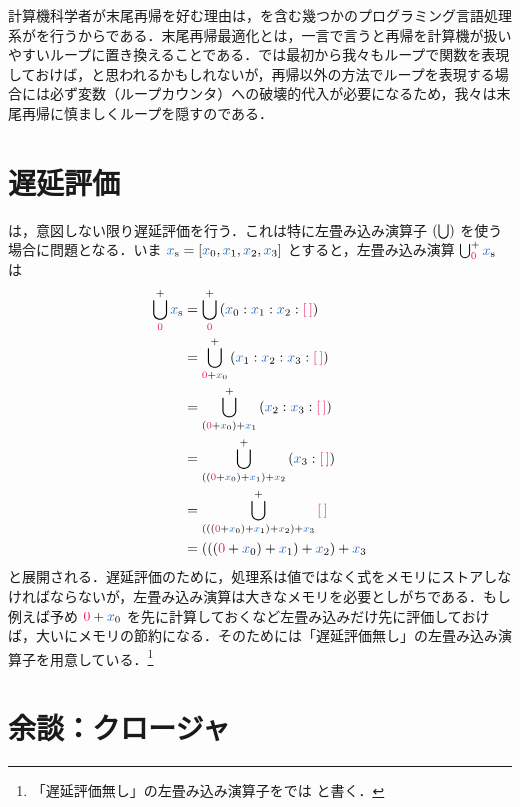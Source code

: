\documentclass[a5paper,twoside,fleqn,draft]{jsbook}
\begin{document}
計算機科学者が末尾再帰を好む理由は，\haskell を含む幾つかのプログラミング言語処理系がを行うからである．末尾再帰最適化とは，一言で言うと再帰を計算機が扱いやすいループに置き換えることである．では最初から我々もループで関数を表現しておけば，と思われるかもしれないが，再帰以外の方法でループを表現する場合には必ず変数（ループカウンタ）への破壊的代入が必要になるため，我々は末尾再帰に慎ましくループを隠すのである．

\section{遅延評価}

\haskell は，意図しない限り遅延評価を行う．これは特に左畳み込み演算子 $(\operatorname*{\bigcup})$ を使う場合に問題となる．いま $\mList{x}=[\hVar{x}_0,\hVar{x}_1,\hVar{x}_2,\hVar{x}_3]$ とすると，左畳み込み演算 $\mFold^+_{\hConstant{0}}\mList{x}$ は
\begin{align}
  \mFold^+_{\hConstant{0}}\mList{x}
  &=\mFold^+_{\hConstant{0}}{}(\hVar{x}_0:\hVar{x}_1:\hVar{x}_2:\mEmptyList)\\
  &=\mFold^+_{\hConstant{0}+\hVar{x}_0}{}(\hVar{x}_1:\hVar{x}_2:\hVar{x}_3:\mEmptyList)\\
  &=\mFold^+_{(\hConstant{0}+\hVar{x}_0)+\hVar{x}_1}{}(\hVar{x}_2:\hVar{x}_3:\mEmptyList)\\
  &=\mFold^+_{((\hConstant{0}+\hVar{x}_0)+\hVar{x}_1)+\hVar{x}_2}{}(\hVar{x}_3:\mEmptyList)\\
  &=\mFold^+_{(((\hConstant{0}+\hVar{x}_0)+\hVar{x}_1)+\hVar{x}_2)+\hVar{x}_3}{}\mEmptyList\\
  &=(((\hConstant{0}+\hVar{x}_0)+\hVar{x}_1)+\hVar{x}_2)+\hVar{x}_3
\end{align}
と展開される．遅延評価のために，\haskell 処理系は値ではなく式をメモリにストアしなければならないが，左畳み込み演算は大きなメモリを必要としがちである．もし例えば予め $\hConstant{0}+\hVar{x}_0$ を先に計算しておくなど左畳み込みだけ先に評価しておけば，大いにメモリの節約になる．そのために\haskell は「遅延評価無し」の左畳み込み演算子を用意している．\footnote{「遅延評価無し」の左畳み込み演算子を\haskell では  と書く．}

%

\section{余談：クロージャ}
\end{document}

